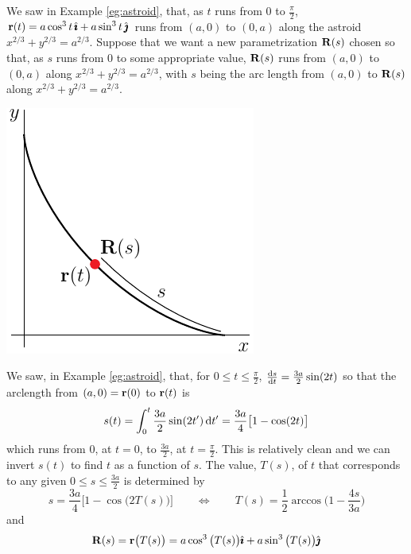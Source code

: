 \begin{eg}\label{eg:reparamAstroid}
We saw in Example \ref{eg:astroid}, that, as $t$ runs from $0$ to 
$\frac{\pi}{2}$, $\mathbf{r}(t) = a \cos^3 t\,\hat{\pmb{\imath}}+a\sin^3t\,\hat{\pmb{\jmath}}$ runs from 
$(a,0)$ to $(0,a)$ along the astroid $x^{2/3}+y^{2/3}=a^{2/3}$.
Suppose that we want a new parametrization $\mathbf{R}(s)$ chosen so that, 
as $s$ runs from $0$ to some appropriate value, $\mathbf{R}(s)$ runs from 
$(a,0)$ to $(0,a)$ along $x^{2/3}+y^{2/3}=a^{2/3}$, with $s$ being
the arc length from $(a,0)$ to $\mathbf{R}(s)$ along $x^{2/3}+y^{2/3}=a^{2/3}$.
\begin{efig}
\begin{center}
     \includegraphics{astroidS.pdf}
\end{center}
\end{efig}
We saw, in Example \ref{eg:astroid}, that, for $0\le t\le \frac{\pi}{2}$, $\diff{s}{t}=\frac{3a}{2}\sin(2t)$ so that the arclength from $(a,0)=\mathbf{r}(0)$ 
to $\mathbf{r}(t)$ is
\begin{equation*}
s(t) = \int_0^t\frac{3a}{2}\sin(2t')\,\mathrm{d}t' =\frac{3a}{4}\big[1-\cos(2t)\big]
\end{equation*}
which runs from $0$, at $t=0$, to $\frac{3a}{2}$, at $t=\frac{\pi}{2}$.
This is relatively clean and we can invert $s(t)$ to find $t$ 
as a function of $s$.
The value, $T(s)$, of $t$ that corresponds to any given 
$0\le s\le\frac{3a}{2}$ is determined by
\begin{equation*}
s=\frac{3a}{4}\big[1-\cos\big(2T(s)\big)\big]\qquad
\iff\qquad
T(s)=\frac{1}{2}\arccos\Big(1-\frac{4s}{3a}\Big)
\end{equation*}
and
\begin{equation*}
\mathbf{R}(s) = \mathbf{r}\big(T(s)\big)
       = a\cos^3\big(T(s)\big)\hat{\pmb{\imath}} + a\sin^3 \big(T(s)\big)\hat{\pmb{\jmath}}
\end{equation*}

\end{eg}
